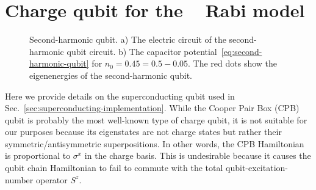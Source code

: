 \documentclass[reprint, aps, prx, amsmath, amssymb, longbibliography, superscriptaddress]{revtex4-2}
\DeclareMathOperator{\Zthree}{\mathbb{Z}_3}
\begin{document}
\section{Charge qubit for the \texorpdfstring{$\Zthree$}{Z3} Rabi model}
\label{app:charge-qubit}


\begin{figure}[t]
    \centering
     \hfill
    \caption{Second-harmonic qubit. a) The electric circuit of the second-harmonic qubit circuit. b) The capacitor potential~\eqref{eq:second-harmonic-qubit} for $n_0 = 0.45 = 0.5 - 0.05 $. The red dots show the eigenenergies of the second-harmonic qubit.}
    \label{fig:second-harmonic-qubit}
\end{figure}

Here we provide details on the superconducting qubit used in Sec.~\ref{sec:superconducting-implementation}. While the Cooper Pair Box (CPB) qubit is probably the most well-known type of charge qubit, it is not suitable for our purposes because its eigenstates are not charge states but rather their symmetric/antisymmetric superpositions. In other words, the CPB Hamiltonian is proportional to $\sigma^x$ in the charge basis. This is undesirable because it causes the qubit chain Hamiltonian to fail to commute with the total qubit-excitation-number operator $S^z$.
\end{document}

